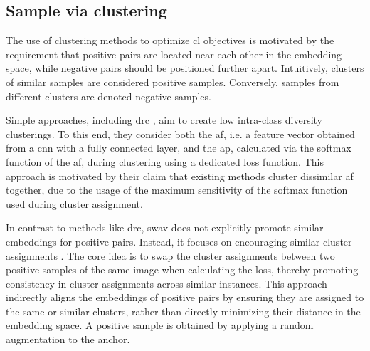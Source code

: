 \subsection{Sample via clustering}
\label{subsec:SampleViaClustering}

The use of clustering methods to optimize \ac{cl} objectives is motivated by 
the requirement that positive pairs are located near each other in the embedding space, 
while negative pairs should be positioned further apart.
Intuitively, clusters of similar samples are considered positive samples.
Conversely, samples from different clusters are denoted negative samples.

Simple approaches, including \ac{drc} \citet{DRC_2020}, aim to create low intra-class diversity clusterings. 
To this end, they consider both the \ac{af}, i.e. a feature vector obtained from a \ac{cnn} with a fully connected layer, 
and the \ac{ap}, calculated via the softmax function of the \ac{af}, 
during clustering using a dedicated loss function.
This approach is motivated by their claim that existing methods cluster dissimilar \ac{af} together,
due to the usage of the maximum sensitivity of the softmax function used during cluster assignment.

In contrast to methods like \ac{drc}, \ac{swav} does not explicitly promote similar embeddings for positive pairs. 
Instead, it focuses on encouraging similar cluster assignments \citep{swav_2020}. 
The core idea is to swap the cluster assignments between two positive samples of the same image when calculating the loss, 
thereby promoting consistency in cluster assignments across similar instances. 
This approach indirectly aligns the embeddings of positive pairs by 
ensuring they are assigned to the same or similar clusters, 
rather than directly minimizing their distance in the embedding space.
A positive sample is obtained by applying a random augmentation to the anchor.





